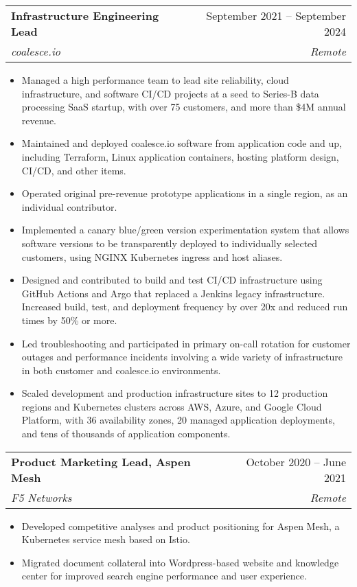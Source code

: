 \documentclass[letterpaper,11pt]{article}
\makeatletter
\newcommand{\resumeItem}[1]{
  \item\footnotesize{
    {#1 \vspace{-2pt}}
  }
}
\newcommand{\resumeSubheading}[4]{
  \vspace{-2pt}\item
    \begin{tabular*}{0.97\textwidth}[t]{l@{\extracolsep{\fill}}r}
      \textbf{\small#1} & \small#2 \\
      \textit{\small#3} & \textit{\small #4} \\
    \end{tabular*}\vspace{-7pt}
}
\newcommand{\resumeSubSubheading}[2]{
    \item
    \begin{tabular*}{0.97\textwidth}{l@{\extracolsep{\fill}}r}
      \textit{\small#1} & \textit{\small #2} \\
    \end{tabular*}\vspace{-7pt}
}
\newcommand{\resumeSubHeadingListEnd}{\end{itemize}}
\newcommand{\resumeItemListStart}{\begin{itemize}}
\newcommand{\resumeItemListEnd}{\end{itemize}\vspace{-5pt}}
\makeatother
\begin{document}
    \resumeSubheading
      {Infrastructure Engineering Lead}{September 2021 -- September 2024}
      {coalesce.io}{Remote}
      \resumeItemListStart
        \resumeItem{Managed a high performance team to lead site reliability, cloud infrastructure, and software CI/CD projects at a seed to Series-B data processing SaaS startup, with over 75 customers, and more than \$4M annual revenue.}
        \resumeItem{Maintained and deployed coalesce.io software from application code and up, including Terraform, Linux application containers, hosting platform design, CI/CD, and other items.}
        \resumeItem{Operated original pre-revenue prototype applications in a single region, as an individual contributor.}
        \resumeItem{Implemented a canary blue/green version experimentation system that allows software versions to be transparently deployed to individually selected customers, using NGINX Kubernetes ingress and host aliases.}
        \resumeItem{Designed and contributed to build and test CI/CD infrastructure using GitHub Actions and Argo that replaced a Jenkins legacy infrastructure. Increased build, test, and deployment frequency by over 20x and reduced run times by 50\% or more.}
        \resumeItem{Led troubleshooting and participated in primary on-call rotation for customer outages and performance incidents involving a wide variety of infrastructure in both customer and coalesce.io environments.}
        \resumeItem{Scaled development and production infrastructure sites to 12 production regions and Kubernetes clusters across AWS, Azure, and Google Cloud Platform, with 36 availability zones, 20 managed application deployments, and tens of thousands of application components.}
      \resumeItemListEnd
      

    \resumeSubheading
      {Product Marketing Lead, Aspen Mesh}{October 2020 -- June 2021}
      {F5 Networks}{Remote}
      \resumeItemListStart
        \resumeItem{Developed competitive analyses and product positioning for Aspen Mesh, a Kubernetes service mesh based on Istio.}
        \resumeItem{Migrated document collateral into Wordpress-based website and knowledge center for improved search engine performance and user experience.}
      \resumeItemListEnd
\end{document}
